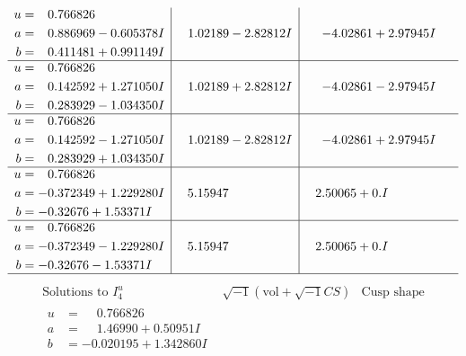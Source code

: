 \documentclass[1p]{elsarticle_modified}
\theoremstyle{definition}
\newcommand{\I}{\sqrt{-1}}
\begin{document}
$$\begin{array}{c|c|c}
\begin{aligned}
u &= \phantom{-}0.766826\phantom{ +0.000000I} \\
a &= \phantom{-}0.886969 - 0.605378 I \\
b &= \phantom{-}0.411481 + 0.991149 I\end{aligned}
 & \phantom{-}1.02189 - 2.82812 I & -4.02861 + 2.97945 I \\ \hline\begin{aligned}
u &= \phantom{-}0.766826\phantom{ +0.000000I} \\
a &= \phantom{-}0.142592 + 1.271050 I \\
b &= \phantom{-}0.283929 - 1.034350 I\end{aligned}
 & \phantom{-}1.02189 + 2.82812 I & -4.02861 - 2.97945 I \\ \hline\begin{aligned}
u &= \phantom{-}0.766826\phantom{ +0.000000I} \\
a &= \phantom{-}0.142592 - 1.271050 I \\
b &= \phantom{-}0.283929 + 1.034350 I\end{aligned}
 & \phantom{-}1.02189 - 2.82812 I & -4.02861 + 2.97945 I \\ \hline\begin{aligned}
u &= \phantom{-}0.766826\phantom{ +0.000000I} \\
a &= -0.372349 + 1.229280 I \\
b &= -0.32676 + 1.53371 I\end{aligned}
 & \phantom{-}5.15947\phantom{ +0.000000I} & \phantom{-}2.50065 + 0. I\phantom{ +0.000000I} \\ \hline\begin{aligned}
u &= \phantom{-}0.766826\phantom{ +0.000000I} \\
a &= -0.372349 - 1.229280 I \\
b &= -0.32676 - 1.53371 I\end{aligned}
 & \phantom{-}5.15947\phantom{ +0.000000I} & \phantom{-}2.50065 + 0. I\phantom{ +0.000000I}\\
 \hline 
 \end{array}$$\newpage$$\begin{array}{c|c|c}  
\text{Solutions to }I^u_{4}& \I (\text{vol} + \sqrt{-1}CS) & \text{Cusp shape}\\
 \hline 
\begin{aligned}
u &= \phantom{-}0.766826\phantom{ +0.000000I} \\
a &= \phantom{-}1.46990 + 0.50951 I \\
b &= -0.020195 + 1.342860 I\end{aligned}

\end{array}$$
\end{document}
